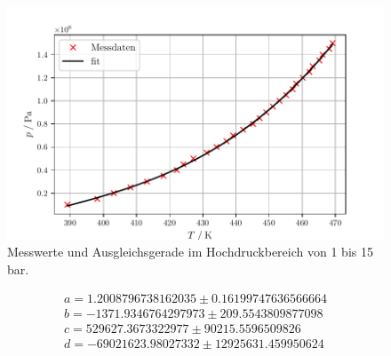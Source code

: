 \begin{figure}
  \centering
  \includegraphics[scale=0.7]{build/plot2.pdf}
  \caption{Messwerte und Ausgleichsgerade im Hochdruckbereich von 1 bis 15 bar.}
  \label{fig:plot2}
\end{figure}
\begin{align*}
  a = 1.2008796738162035 ± 0.16199747636566664\\
  b = -1371.9346764297973 ± 209.5543809877098\\
  c = 529627.3673322977 ± 90215.5596509826\\
  d = -69021623.98027332 ± 12925631.459950624
\end{align*}

